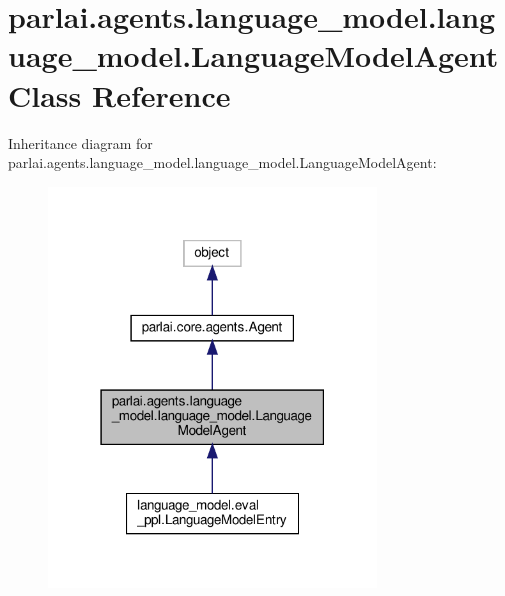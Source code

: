 \hypertarget{classparlai_1_1agents_1_1language__model_1_1language__model_1_1LanguageModelAgent}{}\section{parlai.\+agents.\+language\+\_\+model.\+language\+\_\+model.\+Language\+Model\+Agent Class Reference}
\label{classparlai_1_1agents_1_1language__model_1_1language__model_1_1LanguageModelAgent}


Inheritance diagram for parlai.\+agents.\+language\+\_\+model.\+language\+\_\+model.\+Language\+Model\+Agent\+:
\nopagebreak
\begin{figure}[H]
\begin{center}
\leavevmode
\includegraphics[width=247pt]{da/d5a/classparlai_1_1agents_1_1language__model_1_1language__model_1_1LanguageModelAgent__inherit__graph}
\end{center}
\end{figure}


